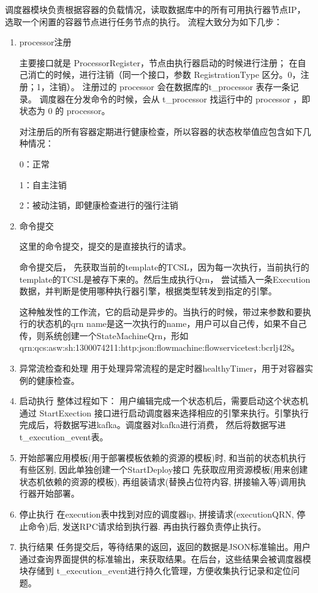 调度器模块负责根据容器的负载情况，读取数据库中的所有可用执行器节点IP，选取一个闲置的容器节点进行任务节点的执行。
流程大致分为如下几步：
\begin{enumerate}
    \item processor注册

    主要接口就是 ProcessorRegister，节点由执行器启动的时候进行注册；
    在自己消亡的时候，进行注销（同一个接口，参数 RegistrationType 区分。0，注册；1，注销）。
    注册过的 processor 会在数据库的t\_processor 表存一条记录。
    调度器在分发命令的时候，会从 t\_processor 找运行中的 processor ，即状态为 0 的 processor。

    对注册后的所有容器定期进行健康检查，所以容器的状态枚举值应包含如下几种情况：

    0：正常

    1：自主注销

    2：被动注销，即健康检查进行的强行注销

    \item 命令提交

    这里的命令提交，提交的是直接执行的请求。

    命令提交后， 先获取当前的template的TCSL，因为每一次执行，当前执行的template的TCSL是被存下来的。然后生成执行Qrn，
    尝试插入一条Execution数据，并判断是使用哪种执行器引擎，根据类型转发到指定的引擎。

    这种触发性的工作流，它的启动是异步的。当执行的时候，带过来参数和要执行的状态机的qrn
    name是这一次执行的name，用户可以自己传，如果不自己传，则系统创建一个StateMachineQrn，形如
    qrn:qcs:asw:sh:1300074211:http:json:flowmachine:flowservicetest:bcrlj428。
    \item 异常流检查和处理
    用于处理异常流程的是定时器healthyTimer，用于对容器实例的健康检查。
    \item 启动执行
    整体过程如下：
    用户编辑完成一个状态机后，需要启动这个状态机
    通过 StartExection 接口进行启动调度器来选择相应的引擎来执行。引擎执行完成后，将数据写进kafka。调度器对kafka进行消费，
    然后将数据写进 t\_execution\_event表。
    \item 开始部署应用模板(用于部署模板依赖的资源的模板)时, 和当前的状态机执行有些区别, 因此单独创建一个StartDeploy接口
    先获取应用资源模板(用来创建状态机依赖的资源的模板), 再组装请求(替换占位符内容, 拼接输入等)调用执行器开始部署。
    \item 停止执行
    在execution表中找到对应的调度器ip, 拼接请求(executionQRN, 停止命令)后, 发送RPC请求给到执行器. 再由执行器负责停止执行。
    \item 执行结果
    任务提交后，等待结果的返回，返回的数据是JSON标准输出。用户通过查询界面提供的标准输出，来获取结果。在后台，这些结果会被调度器模块存储到
    t\_execution\_event进行持久化管理，方便收集执行记录和定位问题。
\end{enumerate}

